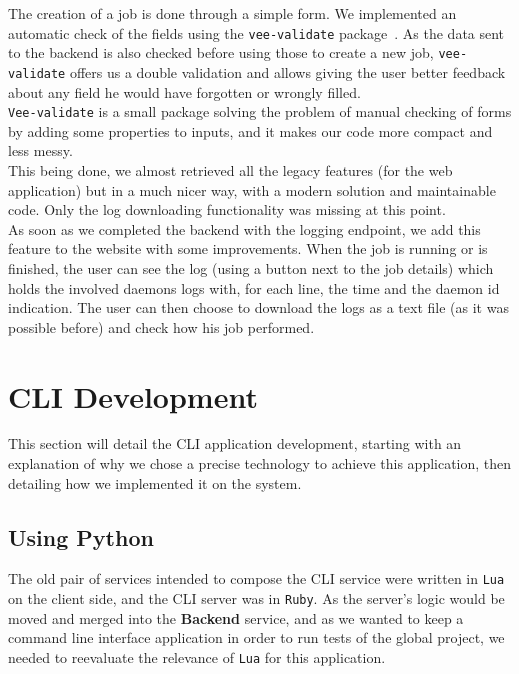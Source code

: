 \documentclass{eplmastersthesis}
\begin{document}
        The creation of a job is done through a simple form. We implemented
        an automatic check of the fields using the \texttt{vee-validate}
        package~\cite{VeeValidate}. As the data sent to the backend is also
        checked before using those to create a new job, \texttt{vee-validate} offers us
        a double validation and allows giving the user better feedback
        about any field he would have forgotten or wrongly filled.\\
        \texttt{Vee-validate} is a small package solving the problem of
        manual checking of forms by adding some properties to inputs, and it
        makes our code more compact and less messy.\\

        This being done, we almost retrieved all the legacy features (for the
        web application) but in a much nicer way, with a modern solution
        and maintainable code. Only the log downloading functionality was
        missing at this point. \\
        As soon as we completed the backend with the logging endpoint, we
        add this feature to the website with some improvements. When the
        job is running or is finished, the user can see the log (using a
        button next to the job details) which holds the involved daemons logs
        with, for each line, the time and the daemon id indication. The user
        can then choose to download the logs as a text file (as it was possible
        before) and check how his job performed.

    \section{CLI Development}

      This section will detail the CLI application development, starting
      with an explanation of why we chose a precise technology to achieve
      this application, then detailing how we implemented it on the system.

      \subsection{Using Python}

        The old pair of services intended to compose the CLI service were
        written in \texttt{Lua} on the client side, and the CLI server was in \texttt{Ruby}. As
        the server's logic would be moved and merged into the \textbf{Backend}
        service, and as we wanted to keep a command line interface application
        in order to run tests of the global project, we needed to reevaluate
        the relevance of \texttt{Lua} for this application.\\
\end{document}
